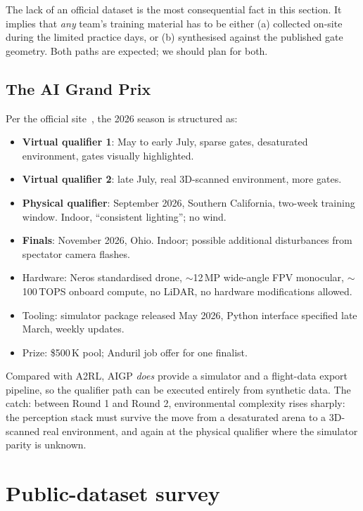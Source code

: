 \documentclass[11pt,a4paper]{article}
\begin{document}
The lack of an official dataset is the most consequential fact in this section. It implies that \emph{any} team's training material has to be either (a) collected on-site during the limited practice days, or (b) synthesised against the published gate geometry. Both paths are expected; we should plan for both.

\subsection{The AI Grand Prix}

Per the official site~\cite{aigrandprix}, the 2026 season is structured as:

\begin{itemize}
  \item \textbf{Virtual qualifier 1}: May to early July, sparse gates, desaturated environment, gates visually highlighted.
  \item \textbf{Virtual qualifier 2}: late July, real 3D-scanned environment, more gates.
  \item \textbf{Physical qualifier}: September 2026, Southern California, two-week training window. Indoor, ``consistent lighting''; no wind.
  \item \textbf{Finals}: November 2026, Ohio. Indoor; possible additional disturbances from spectator camera flashes.
  \item Hardware: Neros standardised drone, $\sim$12\,MP wide-angle FPV monocular, $\sim$100\,TOPS onboard compute, no LiDAR, no hardware modifications allowed.
  \item Tooling: simulator package released May 2026, Python interface specified late March, weekly updates.
  \item Prize: \$500\,K pool; Anduril job offer for one finalist.
\end{itemize}

Compared with A2RL, AIGP \emph{does} provide a simulator and a flight-data export pipeline, so the qualifier path can be executed entirely from synthetic data. The catch: between Round 1 and Round 2, environmental complexity rises sharply: the perception stack must survive the move from a desaturated arena to a 3D-scanned real environment, and again at the physical qualifier where the simulator parity is unknown.

\clearpage
\section{Public-dataset survey}
\end{document}
